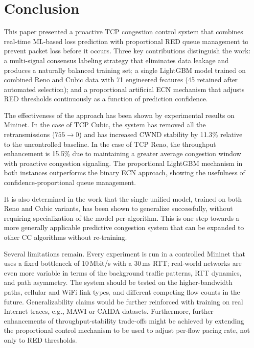 \documentclass[journal]{IEEEtran}
\begin{document}
\section{Conclusion}
\label{sec:conclusion}

This paper presented a proactive TCP congestion control system that combines real-time ML-based loss prediction with proportional RED queue management to prevent packet loss before it occurs. Three key contributions distinguish the work: a multi-signal consensus labeling strategy that eliminates data leakage and produces a naturally balanced training set; a single LightGBM model trained on combined Reno and Cubic data with 71 engineered features (45 retained after automated selection); and a proportional artificial ECN mechanism that adjusts RED thresholds continuously as a function of prediction confidence.

The effectiveness of the approach has been shown by experimental results on Mininet. In the case of TCP Cubic, the system has removed all the retransmissions ($755 \rightarrow 0$) and has increased CWND stability by 11.3\% relative to the uncontrolled baseline. In the case of TCP Reno, the throughput enhancement is 15.5\% due to maintaining a greater average congestion window with proactive congestion signaling. The proportional LightGBM mechanism in both instances outperforms the binary ECN approach, showing the usefulness of confidence-proportional queue management.

It is also determined in the work that the single unified model, trained on both Reno and Cubic variants, has been shown to generalize successfully, without requiring specialization of the model per-algorithm. This is one step towards a more generally applicable predictive congestion system that can be expanded to other CC algorithms without re-training.

Several limitations remain. Every experiment is run in a controlled Mininet that uses a fixed bottleneck of 10\,Mbit/s with a 30\,ms RTT; real-world networks are even more variable in terms of the background traffic patterns, RTT dynamics, and path asymmetry. The system should be tested on the higher-bandwidth paths, cellular and WiFi link types, and different competing flow counts in the future. Generalizability claims would be further reinforced with training on real Internet traces, e.g., MAWI or CAIDA datasets. Furthermore, further enhancements of throughput-stability trade-offs might be achieved by extending the proportional control mechanism to be used to adjust per-flow pacing rate, not only to RED thresholds.
\end{document}
